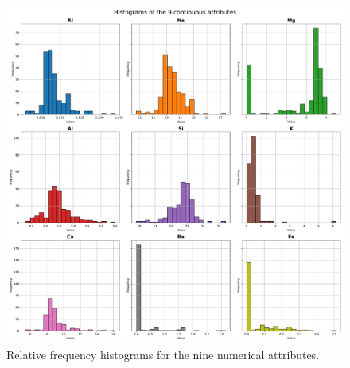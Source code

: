 \documentclass[dtu]{dtuarticle}
\begin{document}
	\begin{figure}
		\centering
		\includegraphics[width=.8\textwidth]{figures/histograms}
		\caption{Relative frequency histograms for the nine numerical attributes.}
		\label{fig:histograms}
	\end{figure}
\end{document}
